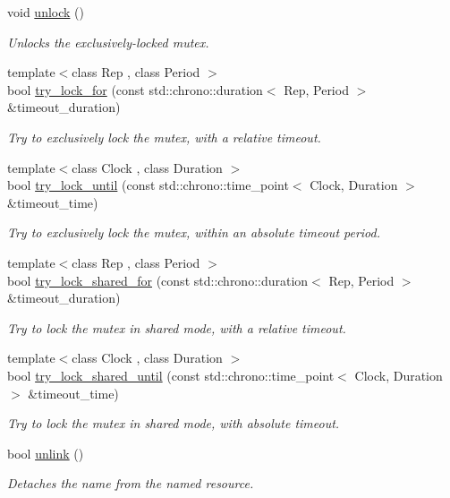 \begin{DoxyCompactItemize}
void \hyperlink{classcpen333_1_1process_1_1impl_1_1shared__mutex__exclusive_ae7f2d10376f1b1fffe20141ec136a721}{unlock} ()
\begin{DoxyCompactList}\small\item\em Unlocks the exclusively-\/locked mutex. \end{DoxyCompactList}\item 
{\footnotesize template$<$class Rep , class Period $>$ }\\bool \hyperlink{classcpen333_1_1process_1_1impl_1_1shared__mutex__exclusive_a6f74ff596d66d4ac6b8e7793b8dca78d}{try\+\_\+lock\+\_\+for} (const std\+::chrono\+::duration$<$ Rep, Period $>$ \&timeout\+\_\+duration)
\begin{DoxyCompactList}\small\item\em Try to exclusively lock the mutex, with a relative timeout. \end{DoxyCompactList}\item 
{\footnotesize template$<$class Clock , class Duration $>$ }\\bool \hyperlink{classcpen333_1_1process_1_1impl_1_1shared__mutex__exclusive_ada5717115b6cc1794422c4ae0a691a07}{try\+\_\+lock\+\_\+until} (const std\+::chrono\+::time\+\_\+point$<$ Clock, Duration $>$ \&timeout\+\_\+time)
\begin{DoxyCompactList}\small\item\em Try to exclusively lock the mutex, within an absolute timeout period. \end{DoxyCompactList}\item 
{\footnotesize template$<$class Rep , class Period $>$ }\\bool \hyperlink{classcpen333_1_1process_1_1impl_1_1shared__mutex__exclusive_a655b0bf8c84c6711e2120540d1c77c04}{try\+\_\+lock\+\_\+shared\+\_\+for} (const std\+::chrono\+::duration$<$ Rep, Period $>$ \&timeout\+\_\+duration)
\begin{DoxyCompactList}\small\item\em Try to lock the mutex in shared mode, with a relative timeout. \end{DoxyCompactList}\item 
{\footnotesize template$<$class Clock , class Duration $>$ }\\bool \hyperlink{classcpen333_1_1process_1_1impl_1_1shared__mutex__exclusive_aaf84cb604f6486ab2c627f236753cb7c}{try\+\_\+lock\+\_\+shared\+\_\+until} (const std\+::chrono\+::time\+\_\+point$<$ Clock, Duration $>$ \&timeout\+\_\+time)
\begin{DoxyCompactList}\small\item\em Try to lock the mutex in shared mode, with absolute timeout. \end{DoxyCompactList}\item 
bool \hyperlink{classcpen333_1_1process_1_1impl_1_1shared__mutex__exclusive_ad296e92049cc48cc3c40ec7404bf836c}{unlink} ()
\begin{DoxyCompactList}\small\item\em Detaches the name from the named resource. \end{DoxyCompactList}\end{DoxyCompactItemize}
